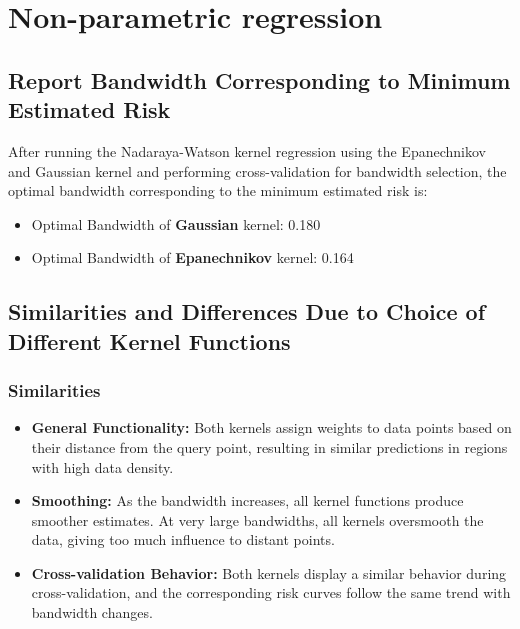 \section{Non-parametric regression}

\subsection{Report Bandwidth Corresponding to Minimum Estimated Risk}

After running the Nadaraya-Watson kernel regression using the Epanechnikov and Gaussian kernel and performing cross-validation for bandwidth selection, the optimal bandwidth corresponding to the minimum estimated risk is:


\begin{itemize}
	\item Optimal Bandwidth of \textbf{Gaussian} kernel: 0.180
	\item Optimal Bandwidth of \textbf{Epanechnikov} kernel: 0.164
\end{itemize}


\subsection{Similarities and Differences Due to Choice of Different Kernel Functions}

\subsubsection{Similarities}
\begin{itemize}
	\item \textbf{General Functionality:} Both kernels assign weights to
	      data points based on their distance from the query point, resulting
	      in similar predictions in regions with high data density.
	\item \textbf{Smoothing:} As the bandwidth increases, all kernel
	      functions produce smoother estimates. At very large bandwidths, all
	      kernels oversmooth the data, giving too much influence to distant
	      points.
	\item \textbf{Cross-validation Behavior:} Both kernels display a
	      similar behavior during cross-validation, and the corresponding
	      risk curves follow the same trend with bandwidth changes.
\end{itemize}

